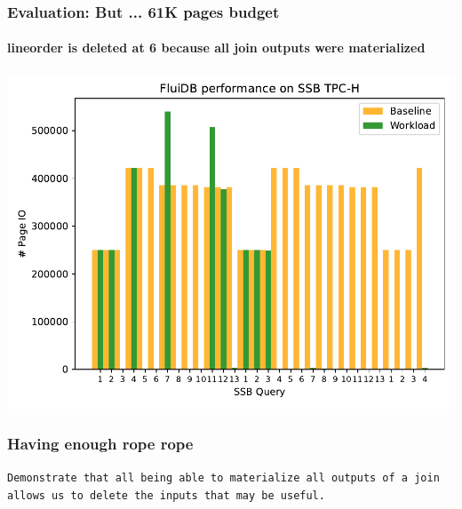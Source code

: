 \begin{frame}
  \frametitle{Evaluation: But ... 61K pages budget}
  \framesubtitle{lineorder is deleted at 6 because all join outputs were materialized}
  \includegraphics[width=.9\linewidth]{../plans/io_perf_61000.pdf}
\end{frame}

\begin{frame}
  \frametitle{Having enough rope rope}

  \texttt{Demonstrate that all being able to materialize all outputs
    of a join allows us to delete the inputs that may be useful.}
\end{frame}
